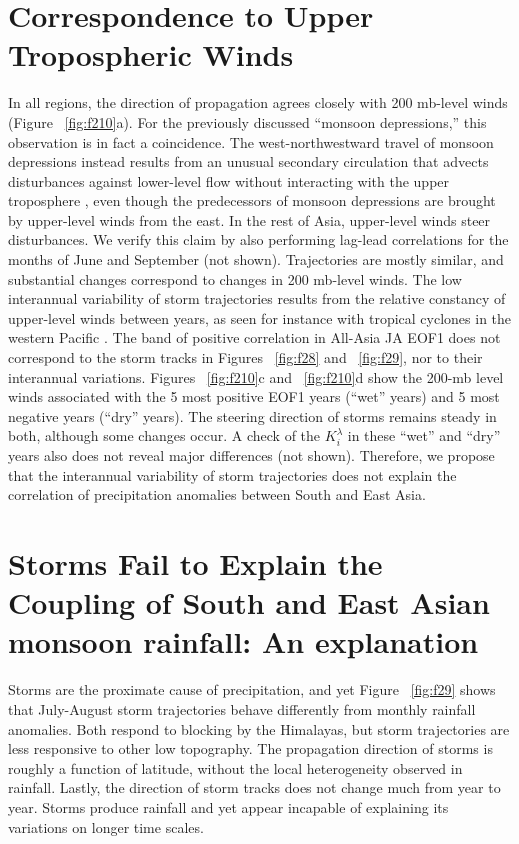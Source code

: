 \section{Correspondence to Upper Tropospheric Winds}	 
	 
	 In all regions, the direction of propagation agrees closely with 200 mb-level winds (Figure ~\ref{fig:f210}a). For the previously discussed ``monsoon depressions,'' this observation is in fact a coincidence. The west-northwestward travel of monsoon depressions instead results from an unusual secondary circulation that advects disturbances against lower-level flow without interacting with the upper troposphere \parencite{Chen2000,Chen2005}, even though the predecessors of monsoon depressions are brought by upper-level winds from the east. In the rest of Asia, upper-level winds steer disturbances. We verify this claim by also performing lag-lead correlations for the months of June and September (not shown). Trajectories are mostly similar, and substantial changes correspond to changes in 200 mb-level winds. The low interannual variability of storm trajectories results from the relative constancy of upper-level winds between years, as seen for instance with tropical cyclones in the western Pacific \parencite{Kumar2005}. The band of positive correlation in All-Asia JA EOF1 does not correspond to the storm tracks in Figures ~\ref{fig:f28} and ~\ref{fig:f29}, nor to their interannual variations. Figures ~\ref{fig:f210}c and ~\ref{fig:f210}d show the 200-mb level winds associated with the 5 most positive EOF1 years (``wet'' years) and 5 most negative years (``dry'' years). The steering direction of storms remains steady in both, although some changes occur. A check of the $K_i^\lambda$ in these ``wet'' and ``dry'' years also does not reveal major differences (not shown). Therefore, we propose that the interannual variability of storm trajectories does not explain the correlation of precipitation anomalies between South and East Asia.
	 
\section{Storms Fail to Explain the Coupling of South and East Asian monsoon rainfall: An explanation}
	 
	 Storms are the proximate cause of precipitation, and yet Figure ~\ref{fig:f29} shows that July-August storm trajectories behave differently from monthly rainfall anomalies. Both respond to blocking by the Himalayas, but storm trajectories are less responsive to other low topography. The propagation direction of storms is roughly a function of latitude, without the local heterogeneity observed in rainfall. Lastly, the direction of storm tracks does not change much from year to year. Storms produce rainfall and yet appear incapable of explaining its variations on longer time scales.
	 
